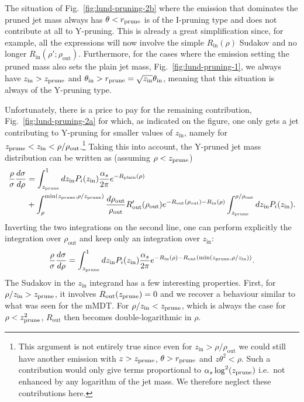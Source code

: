 The situation of Fig.~\ref{fig:lund-pruning-2b} where the emission that
dominates the pruned jet mass always has $\theta<r_{\text{prune}}$ is of the
I-pruning type and does not contribute at all to Y-pruning.
%
This is already a great simplification since, for example, all the
expressions will now involve the simple $R_\text{in}(\rho)$ Sudakov
and no longer $R_\text{in}(\rho';\rho_\text{out})$.
%
Furthermore, for the cases where the emission setting the pruned mass
also sets the plain jet mass, Fig.~\ref{fig:lund-pruning-1}, we always
have $z_\text{in}>z_{\text{prune}}$ and
$\theta_\text{in}>r_{\text{prune}}=\sqrt{z_\text{in}}\theta_\text{in}$, meaning that
this situation is always of the Y-pruning type.

Unfortunately, there is a price to pay for the remaining contribution,
Fig.~\ref{fig:lund-pruning-2a} for which, as indicated on the figure,
one only gets a jet contributing to Y-pruning for smaller values of
$z_\text{in}$, namely for
$z_{\text{prune}}<z_\text{in}<\rho/\rho_\text{out}$.\footnote{This argument is
  not entirely true since even for $z_\text{in}>\rho/\rho_\text{out}$
  we could still have another emission with $z>z_{\text{prune}}$,
  $\theta>r_{\text{prune}}$ and $z\theta^2<\rho$. Such a contribution would
  only give terms proportional to $\alpha_s\log^2(z_{\text{prune}})$ i.e.\ not
  enhanced by any logarithm of the jet mass. We therefore neglect
  these contributions here.}
%
Taking this into account, the Y-pruned jet mass distribution can
be written as  (assuming $\rho<z_{\text{prune}}$)
\begin{align}
  \frac{\rho}{\sigma}\frac{d\sigma}{d\rho}
   & = \int_{z_{\text{prune}}}^1 dz_\text{in} P_i(z_\text{in})
   \frac{\alpha_s}{2\pi} e^{-R_\text{plain}(\rho)}\\
   & + \int_\rho^{\text{min}(z_{\text{prune}},\rho/z_{\text{prune}})}\frac{d\rho_\text{out}}{\rho_\text{out}}R'_\text{out}(\rho_\text{out})
    e^{-R_\text{out}(\rho_\text{out})-R_\text{in}(\rho)}
     \int_{z_{\text{prune}}}^{\rho/\rho_\text{out}} dz_\text{in} P_i(z_\text{in}).\nonumber
\end{align}
Inverting the two integrations on the second line, one can perform
explicitly the integration over $\rho_\text{out}$ and keep only an
integration over $z_\text{in}$:
\begin{equation}\label{eq:Ypruning}
  \frac{\rho}{\sigma}\frac{d\sigma}{d\rho}
    =  \int_{z_{\text{prune}}}^1 dz_\text{in} P_i(z_\text{in})
   \frac{\alpha_s}{2\pi} e^{-R_\text{in}(\rho)-R_\text{out}({\text{min}}(z_{\text{prune}},\rho/z_\text{in}))}.
 \end{equation}
 The Sudakov in the $z_\text{in}$ integrand has a few interesting
 properties. First, for $\rho/z_\text{in}>z_{\text{prune}}$, it involves
 $R_\text{out}(z_{\text{prune}})=0$ and we recover a behaviour similar to what
 was seen for the mMDT. For $\rho/z_\text{in}<z_{\text{prune}}$, which is
 always the case for $\rho<z_{\text{prune}}^2$, $R_\text{out}$ then becomes
 double-logarithmic in $\rho$.


